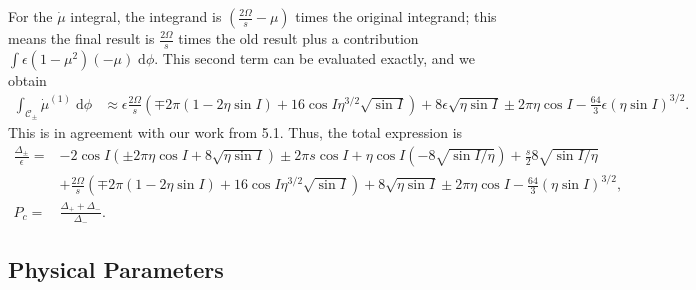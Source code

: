 \documentclass[11pt,
        usenames, %
        dvipsnames %
    ]{article}
\newcommand*{\p}[1]{\left(#1\right)}
\begin{document}
For the $\dot{\mu}$ integral, the integrand is $\p{\frac{2\Omega}{s} - \mu}$
times the original integrand; this means the final result is $\frac{2\Omega}{s}$
times the old result plus a contribution $\int \epsilon \p{1 - \mu^2}\p{-\mu}
\;\mathrm{d}\phi$. This second term can be evaluated exactly, and we obtain
\begin{align*}
    \int_{\mathcal{C}_{\pm}}\dot{\mu}^{(1)}\;\mathrm{d}\phi
        &\approx \epsilon\frac{2\Omega}{s}\p{\mp 2\pi\p{1 - 2\eta \sin I}
            + 16\cos I \eta^{3/2}\sqrt{\sin I}}
            + 8\epsilon\sqrt{\eta \sin I}
            \pm 2 \pi \eta \cos I
            - \frac{64}{3}\epsilon \p{\eta \sin I}^{3/2}.
\end{align*}
This is in agreement with our work from 5.1. Thus, the total expression is
\begin{align}
    \frac{\Delta_{\pm}}{\epsilon} ={}&
        -2\cos I\p{\pm 2\pi \eta \cos I + 8\sqrt{\eta \sin I}}
        \pm 2\pi s\cos I
        + \eta \cos I \p{-8\sqrt{\sin I / \eta}}
            + \frac{s}{2}8\sqrt{\sin I/\eta}\nonumber\\
        &+ \frac{2\Omega}{s}\p{\mp 2\pi\p{1 - 2\eta \sin I}
            + 16\cos I \eta^{3/2}\sqrt{\sin I}}
            + 8\sqrt{\eta \sin I}
            \pm 2 \pi \eta \cos I
            - \frac{64}{3} \p{\eta \sin I}^{3/2},\\
    P_c ={}& \frac{\Delta_+ + \Delta_-}{\Delta_-}.
\end{align}

\subsection{Physical Parameters}
\end{document}
